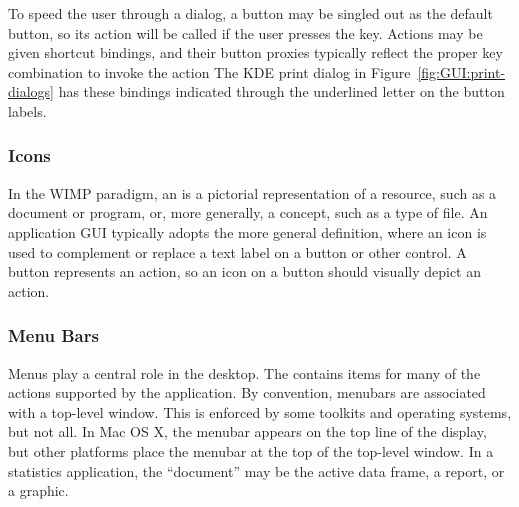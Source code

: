 To speed the user through a dialog, a button may be singled out as the
default button, so its action will be called if the user presses the
 key. Actions may be given shortcut bindings, and their
button proxies typically reflect the proper key combination to invoke
the action The KDE print dialog in Figure~\ref{fig:GUI:print-dialogs}
has these bindings indicated through the underlined letter on the
button labels.


\subsubsection{Icons}
\label{sec:GUI:icons}

In the WIMP paradigm, an  is a pictorial representation of a
resource, such as a document or program, or, more generally, a
concept, such as a type of file. An application GUI typically adopts
the more general definition, where an icon is used to complement or
replace a text label on a button or other control. A button represents
an action, so an icon on a button should visually depict an action.



\subsubsection{Menu Bars}
\label{sec:GUI:menubars}

Menus play a central role in the  desktop. The  contains items for many of the actions supported by the
application.  By convention, menubars are associated with a top-level
window. This is enforced by some toolkits and operating systems, but
not all. In Mac OS X, the menubar appears on the top line of the
display, but other platforms place the menubar at the top of the
top-level window. In a statistics application, the ``document'' may be
the active data frame, a report, or a graphic.

